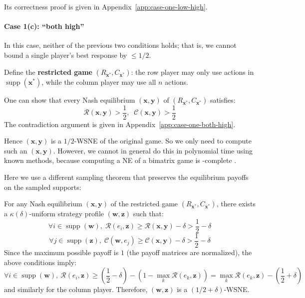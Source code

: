 Its correctness proof is given in Appendix~\ref{app:case-one-low-high}.

\paragraph{Case 1(c): ``both high''}
In this case, neither of the previous two conditions holds; that is, we cannot bound a single player's best response by $\le 1/2$.

Define the \textbf{restricted game} $(R_{\mathbf{x}^*}, C_{\mathbf{x}^*})$: the row player may only use actions in $\operatorname{supp}(\mathbf{x}^*)$, while the column player may use all $n$ actions.

One can show that every Nash equilibrium $(\mathbf{x}, \mathbf{y})$ of $(R_{\mathbf{x}^*}, C_{\mathbf{x}^*})$ satisfies:
\[
  \mathcal{R}(\mathbf{x}, \mathbf{y}) > \frac12,\;\; \mathcal{C}(\mathbf{x}, \mathbf{y}) > \frac12
\]
The contradiction argument is given in Appendix~\ref{app:case-one-both-high}.

Hence $(\mathbf{x}, \mathbf{y})$ is a $1/2$-WSNE of the original game. So we only need to compute such an $(\mathbf{x}, \mathbf{y})$. However, we cannot in general do this in polynomial time using known methods, because computing a NE of a bimatrix game is \PPAD-complete \cite{DGP09}.

Here we use a different sampling theorem that preserves the equilibrium payoffs on the sampled supports:

\begin{lemma}
  For any Nash equilibrium $(\mathbf{x}, \mathbf{y})$ of the restricted game $(R_{\mathbf{x}^*}, C_{\mathbf{x}^*})$, there exists a $\kappa(\delta)$-uniform strategy profile $(\mathbf{w}, \mathbf{z})$ such that:
  \[
    \forall i \in \operatorname{supp}(\mathbf{w}),\; \mathcal{R}(e_i, \mathbf{z}) \ge \mathcal{R}(\mathbf{x}, \mathbf{y}) - \delta > \frac12 - \delta
  \]
  \[
    \forall j \in \operatorname{supp}(\mathbf{z}),\; \mathcal{C}(\mathbf{w}, e_j) \ge \mathcal{C}(\mathbf{x}, \mathbf{y}) - \delta > \frac12 - \delta
  \]
  Since the maximum possible payoff is $1$ (the payoff matrices are normalized), the above conditions imply:
  \[
    \forall i \in \operatorname{supp}(\mathbf{w}),\ \mathcal{R}(e_i, \mathbf{z}) \ge \left(\frac12 - \delta\right) - \left(1 - \max_k \mathcal{R}(e_k, \mathbf{z})\right) = \max_k \mathcal{R}(e_k, \mathbf{z}) - \left(\frac12 + \delta\right)
  \]
  and similarly for the column player. Therefore, $(\mathbf{w}, \mathbf{z})$ is a $(1/2+\delta)$-WSNE.
\end{lemma}

